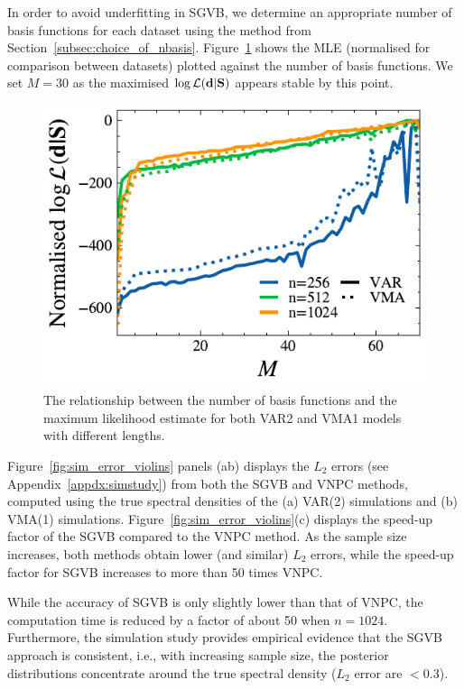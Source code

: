 \documentclass[%
 reprint,
 amsmath,amssymb,
 aps,
 nofootinbib,
]{revtex4-2}
\begin{document}
In order to avoid underfitting in SGVB, we determine an appropriate number of basis functions for each dataset using the method from Section~\ref{subsec:choice_of_nbasis}. 
Figure~\ref{fig:sim_basis} shows the MLE (normalised for comparison between datasets) plotted against the number of basis functions.
We set $M=30$ as the maximised $\log \mathcal{L}({\bf d}|{\bf S})$ appears stable by this point. 
\begin{figure}[h]
  \includegraphics[width=\columnwidth]{sim_basis.pdf}
  \caption{The relationship between the number of basis functions and the maximum likelihood estimate for both VAR2 and VMA1 models with different lengths. }
  \label{fig:sim_basis}
\end{figure}

Figure~\ref{fig:sim_error_violins} panels (ab) displays the $L_2$ errors (see Appendix~\ref{appdx:simstudy}) from both the SGVB and VNPC methods, computed using the true spectral densities of the (a) VAR(2) simulations and (b) VMA(1) simulations. 
Figure~\ref{fig:sim_error_violins}(c) displays the speed-up factor of the SGVB compared to the VNPC method. 
As the sample size increases, both methods obtain lower (and similar) $L_2$ errors, while the speed-up factor for SGVB increases to more than 50 times VNPC.

While the accuracy of \ac{SGVB} is only slightly lower than that of VNPC, the computation time is reduced by a factor of about 50 when $n=1024$.
Furthermore, the simulation study provides empirical evidence that the \ac{SGVB} approach is consistent, i.e., with increasing sample size, the posterior distributions concentrate around the true spectral density ($L_2$ error are $<0.3$). 
\end{document}
